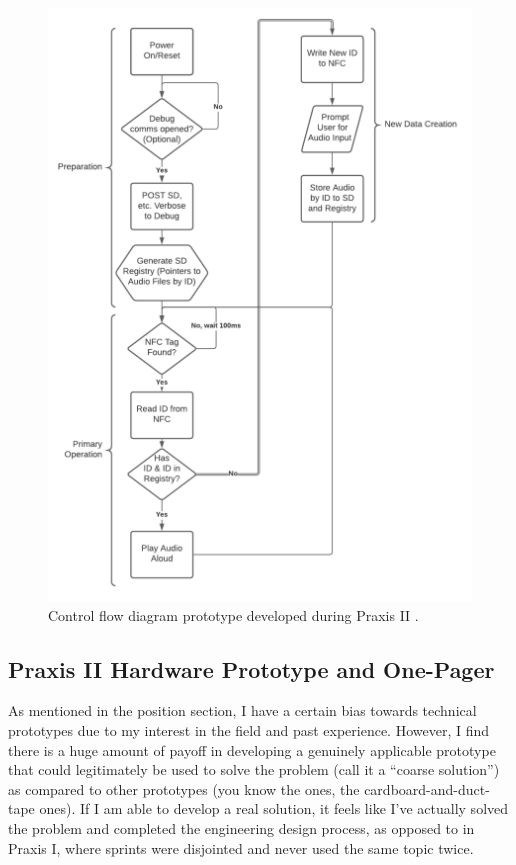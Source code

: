 \documentclass{report}
\begin{document}
\begin{figure}[h]
    \centering
    \includegraphics[width=\textwidth/2]{images/control.png}
    \hfill
    \caption{Control flow diagram prototype developed during Praxis II \cite{controlflow}.}
\end{figure}

\subsection{Praxis II Hardware Prototype and One-Pager}
As mentioned in the position section, I have a certain bias towards technical 
prototypes due to my interest in the field and past experience. However, I 
find there is a huge amount of payoff in developing a genuinely applicable 
prototype that could legitimately be used to solve the problem (call it a 
“coarse solution”) as compared to other prototypes (you know the ones, the 
cardboard-and-duct-tape ones). If I am able to develop a real solution, it 
feels like I’ve actually solved the problem and completed the engineering 
design process, as opposed to in Praxis I, where sprints were disjointed and 
never used the same topic twice.
\end{document}
